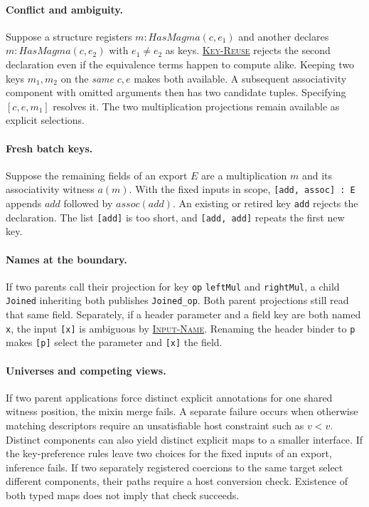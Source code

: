 \documentclass{article}
\newcommand{\ttt}[1]{\texttt{#1}}
\newcommand{\ruse}[1]{\hyperlink{rule-#1}{\textsc{#1}}}
\begin{document}
\paragraph{Conflict and ambiguity.}
Suppose a structure registers $m:\mathit{HasMagma}(c,e_1)$ and
another declares $m:\mathit{HasMagma}(c,e_2)$ with $e_1\ne e_2$ as
keys. \ruse{Key-Reuse} rejects the second declaration even if the
equivalence terms happen to compute alike. Keeping two keys $m_1,m_2$ on the \emph{same}
$c,e$ makes both available. A subsequent associativity component
with omitted arguments then has two candidate tuples. Specifying
$[c,e,m_1]$ resolves it. The two multiplication projections remain
available as explicit selections.

\paragraph{Fresh batch keys.}
Suppose the remaining fields of an export $E$ are a multiplication $m$
and its associativity witness $a(m)$. With the fixed inputs in scope,
\ttt{[add, assoc] : E} appends $\mathit{add}$ followed by
$\mathit{assoc}(\mathit{add})$. An existing or retired key
\ttt{add} rejects the declaration. The list \ttt{[add]} is too short,
and \ttt{[add, add]} repeats the first new key.

\paragraph{Names at the boundary.}
If two parents call their projection for key \ttt{op} \ttt{leftMul}
and \ttt{rightMul}, a child \ttt{Joined} inheriting both publishes
\ttt{Joined\_op}. Both parent projections still read that same field.
Separately, if a header parameter and a field key are both named
\ttt{x}, the input \ttt{[x]} is ambiguous by \ruse{Input-Name}.
Renaming the header binder to \ttt{p} makes \ttt{[p]} select the
parameter and \ttt{[x]} the field.

\paragraph{Universes and competing views.}
If two parent applications force distinct explicit annotations for
one shared witness position, the mixin merge fails. A separate
failure occurs when otherwise matching descriptors require an
unsatisfiable host constraint such as $v<v$. Distinct components can
also yield distinct explicit maps to a smaller interface. If the
key-preference rules leave two choices for the fixed inputs of an export,
inference fails. If two separately registered coercions to the same
target select different components, their paths require a host
conversion check. Existence of both typed maps does not imply that
check succeeds.
\end{document}
